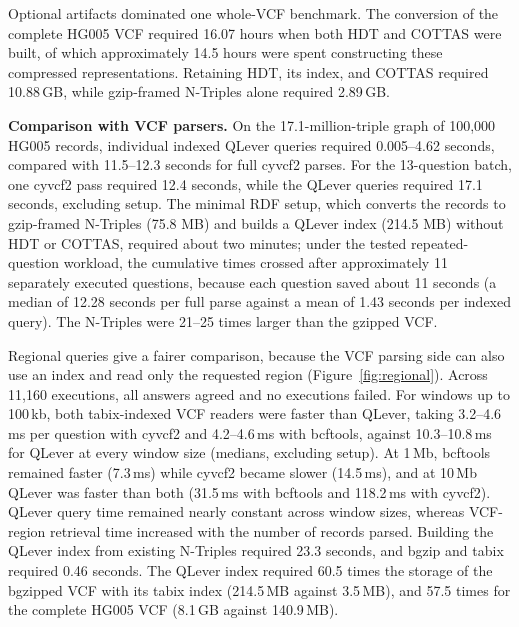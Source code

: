 \documentclass[pdflatex,sn-mathphys-num,referee]{sn-jnl}
\begin{document}
Optional artifacts dominated one whole-VCF benchmark.
The conversion of the complete HG005 VCF required 16.07 hours when both HDT and COTTAS were built, of which approximately 14.5 hours were spent constructing these compressed representations.
Retaining HDT, its index, and COTTAS required 10.88\,GB, while gzip-framed N-Triples alone required 2.89\,GB.

\textbf{Comparison with VCF parsers.}
On the 17.1-million-triple graph of 100,000 HG005 records, individual indexed QLever queries required 0.005--4.62 seconds, compared with 11.5--12.3 seconds for full cyvcf2 parses.
For the 13-question batch, one cyvcf2 pass required 12.4 seconds, while the QLever queries required 17.1 seconds, excluding setup.
The minimal RDF setup, which converts the records to gzip-framed N-Triples (75.8 MB) and builds a QLever index (214.5 MB) without HDT or COTTAS, required about two minutes; under the tested repeated-question workload, the cumulative times crossed after approximately 11 separately executed questions, because each question saved about 11 seconds (a median of 12.28 seconds per full parse against a mean of 1.43 seconds per indexed query).
The N-Triples were 21--25 times larger than the gzipped VCF.

Regional queries give a fairer comparison, because the VCF parsing side can also use an index and read only the requested region (Figure~\ref{fig:regional}).
Across 11,160 executions, all answers agreed and no executions failed.
For windows up to 100\,kb, both tabix-indexed VCF readers were faster than QLever, taking 3.2--4.6\,ms per question with cyvcf2 and 4.2--4.6\,ms with bcftools, against 10.3--10.8\,ms for QLever at every window size (medians, excluding setup).
At 1\,Mb, bcftools remained faster (7.3\,ms) while cyvcf2 became slower (14.5\,ms), and at 10\,Mb QLever was faster than both (31.5\,ms with bcftools and 118.2\,ms with cyvcf2).
QLever query time remained nearly constant across window sizes, whereas VCF-region retrieval time increased with the number of records parsed.
Building the QLever index from existing N-Triples required 23.3 seconds, and bgzip and tabix required 0.46 seconds.
The QLever index required 60.5 times the storage of the bgzipped VCF with its tabix index (214.5\,MB against 3.5\,MB), and 57.5 times for the complete HG005 VCF (8.1\,GB against 140.9\,MB).
\end{document}
